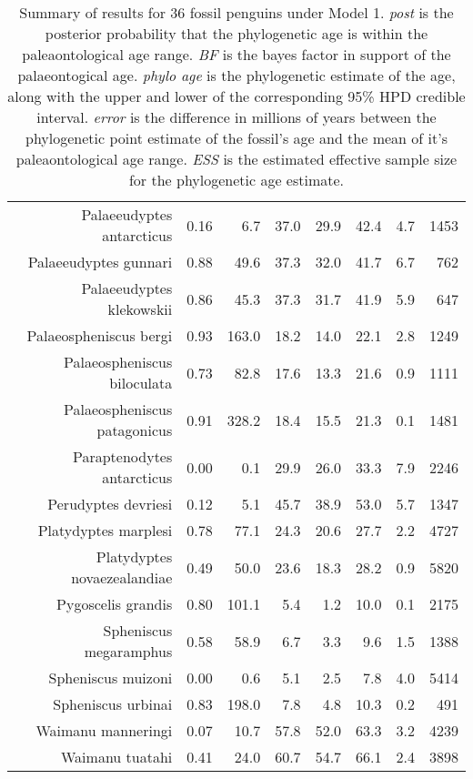 \begin{table}[ht]
\begin{tabular}{rrrrrrrr}
  Palaeeudyptes antarcticus & 0.16 & 6.7 & 37.0 & 29.9 & 42.4 & 4.7 & 1453 \\ 
  Palaeeudyptes gunnari & 0.88 & 49.6 & 37.3 & 32.0 & 41.7 & 6.7 & 762 \\ 
  Palaeeudyptes klekowskii & 0.86 & 45.3 & 37.3 & 31.7 & 41.9 & 5.9 & 647 \\ 
  Palaeospheniscus bergi & 0.93 & 163.0 & 18.2 & 14.0 & 22.1 & 2.8 & 1249 \\ 
  Palaeospheniscus biloculata & 0.73 & 82.8 & 17.6 & 13.3 & 21.6 & 0.9 & 1111 \\ 
  Palaeospheniscus patagonicus & 0.91 & 328.2 & 18.4 & 15.5 & 21.3 & 0.1 & 1481 \\ 
  Paraptenodytes antarcticus & 0.00 & 0.1 & 29.9 & 26.0 & 33.3 & 7.9 & 2246 \\ 
  Perudyptes devriesi & 0.12 & 5.1 & 45.7 & 38.9 & 53.0 & 5.7 & 1347 \\ 
  Platydyptes marplesi & 0.78 & 77.1 & 24.3 & 20.6 & 27.7 & 2.2 & 4727 \\ 
  Platydyptes novaezealandiae & 0.49 & 50.0 & 23.6 & 18.3 & 28.2 & 0.9 & 5820 \\ 
  Pygoscelis grandis & 0.80 & 101.1 & 5.4 & 1.2 & 10.0 & 0.1 & 2175 \\ 
  Spheniscus megaramphus & 0.58 & 58.9 & 6.7 & 3.3 & 9.6 & 1.5 & 1388 \\ 
  Spheniscus muizoni & 0.00 & 0.6 & 5.1 & 2.5 & 7.8 & 4.0 & 5414 \\ 
  Spheniscus urbinai & 0.83 & 198.0 & 7.8 & 4.8 & 10.3 & 0.2 & 491 \\ 
  Waimanu manneringi & 0.07 & 10.7 & 57.8 & 52.0 & 63.3 & 3.2 & 4239 \\ 
  Waimanu tuatahi & 0.41 & 24.0 & 60.7 & 54.7 & 66.1 & 2.4 & 3898 \\ 
   \hline
\end{tabular}
\caption{Summary of results for 36 fossil penguins under Model 1. {\em post} is the posterior probability that the phylogenetic age is within the paleaontological age range. {\em BF} is the bayes factor in support of the palaeontogical age. {\em phylo age} is the phylogenetic estimate of the age, along with the upper and lower of the corresponding 95\% HPD credible interval. {\em error} is the difference in millions of years between the phylogenetic point estimate of the fossil's age and the mean of it's paleaontological age range. {\em ESS} is the estimated effective sample size for the phylogenetic age estimate.} 
\label{fossilTable1}
\end{table}
